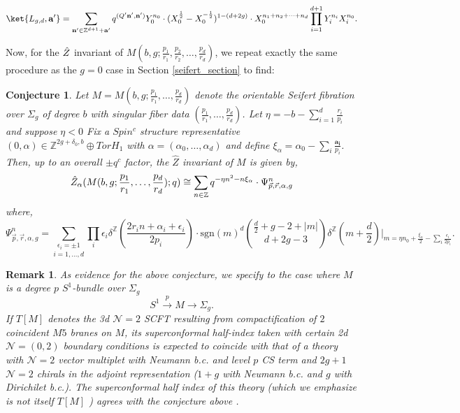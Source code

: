 \documentclass{article}
\newcommand{\Z}{{\mathbb Z}}
\newtheorem{conjecture}{Conjecture}
\newtheorem{remark}{Remark}[section]
\numberwithin{corollary}{theorem}
\numberwithin{corollary}{proposition}
\begin{document}
$$\ket{L_{g,d},\mathbf{a}'} = \sum_{\mathbf{n'}\in \Z^{d+1}+\mathbf{a}'} q^{(Q'\mathbf{n'},\mathbf{n'})} Y^{n_0}_0 \cdot (X^{\frac{1}{2}}_0-X^{-\frac{1}{2}}_0)^{1-(d+2g)}  \cdot X_0^{n_1+n_2+\cdots+n_d} \prod^{d+1}_{i=1}Y_i^{n_i}X^{n_0}_i.$$

Now, for the $\Hat{Z}$ invariant of $M\left(b,g; \frac{p_1}{r_1},\frac{p_2}{r_2},\ldots,\frac{p_d}{r_d}\right)$, we repeat exactly the same procedure as the $g=0$ case in Section \ref{seifert_section} to find:
\begin{conjecture}
    Let $M= M(b,g;\frac{p_1}{r_1},\ldots,\frac{p_d}{r_d})$ denote the orientable Seifert fibration over $\Sigma_g$ of degree $b$ with singular fiber data $(\frac{p_1}{r_1},\ldots,\frac{p_d}{r_d})$. Let $\eta = -b -\sum^d_{i=1}\frac{r_i}{p_i}$ and suppose $\eta<0$ Fix a $Spin^c$ structure representative $(0,\alpha) \in \mathbb{Z}^{2g+\delta_0,b}\oplus TorH_1$ with $\alpha = (\alpha_0,\ldots,\alpha_d)$ and define $\xi_\alpha = \alpha_0 - \sum_i \frac{\mathbf{a_i}}{p_i}$. Then, up to an overall $\pm q^c$ factor, the $\hat{Z}$ invariant of $M$ is given by, 
    $$\Hat{Z}_{\alpha}(M(b,g;\frac{p_1}{r_1},\ldots,\frac{p_d}{r_d});q) \cong \sum_{n\in \mathbb{Z}}q^{-\eta n^2 -n \xi_\alpha} \cdot \Psi^n_{\Vec{p},\Vec{r},\alpha,g}$$
    where, 
    $$\Psi^n_{\Vec{p},\Vec{r},\alpha,g} = \underset{i=1,\ldots,d}{\sum_{\epsilon_i=\pm1}} \prod_i \epsilon_i \delta^\mathbb{Z}\left( \frac{2r_i n +\alpha_i+\epsilon_i}{2p_i}\right)\cdot \mathrm{sgn}(m)^d \binom{\frac{d}{2}+g-2+|m|}{d+2g-3}\delta^\mathbb{Z}\left(m+\frac{d}{2}\right)\bigg|_{m = \eta n_0 + \frac{\xi_\alpha}{2}- \sum_i\frac{\epsilon_i}{2p_i}}.$$
\end{conjecture}


\begin{remark}
    As evidence for the above conjecture, we specify to the case where $M$ is a degree $p$ $S^1$-bundle over $\Sigma_g$
$$S^1 \overset{p}{\rightarrow} M \rightarrow\Sigma_g.$$
If $T[M]$ denotes the 3d $\mathcal{N}=2$ SCFT resulting from compactification of $2$ coincident $M5$ branes on $M$, its superconformal half-index taken with certain 2d $\mathcal{N}= (0,2)$ boundary conditions is expected to coincide with that of a theory with $\mathcal{N}=2$ vector multiplet with Neumann b.c. and level $p$ CS term and $2g+1$ $\mathcal{N}=2$ chirals in the adjoint representation ($1+g$ with Neumann b.c. and $g$ with Dirichilet b.c.). The superconformal half index of this theory (which we emphasize is \textit{not} itself $T[M]$ \cite{3d3d}) agrees with the conjecture above \cite{GPPV}. 
\end{remark}
\end{document}
